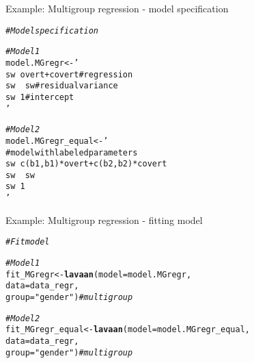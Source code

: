 \documentclass[10pt]{beamer}\usepackage[]{graphicx}\usepackage[]{xcolor}
\makeatletter
\newcommand{\hlsng}[1]{\textcolor[rgb]{0.192,0.494,0.8}{#1}}%
\newcommand{\hlcom}[1]{\textcolor[rgb]{0.678,0.584,0.686}{\textit{#1}}}%
\newcommand{\hldef}[1]{\textcolor[rgb]{0.345,0.345,0.345}{#1}}%
\newcommand{\hlkwb}[1]{\textcolor[rgb]{0.69,0.353,0.396}{#1}}%
\newcommand{\hlkwc}[1]{\textcolor[rgb]{0.333,0.667,0.333}{#1}}%
\newcommand{\hlkwd}[1]{\textcolor[rgb]{0.737,0.353,0.396}{\textbf{#1}}}%
\newenvironment{kframe}{%
 \def\at@end@of@kframe{}%
 \ifinner\ifhmode%
  \def\at@end@of@kframe{\end{minipage}}%
  \begin{minipage}{\columnwidth}%
 \fi\fi%
 \def\FrameCommand##1{\hskip\@totalleftmargin \hskip-\fboxsep
 \colorbox{shadecolor}{##1}\hskip-\fboxsep
     \hskip-\linewidth \hskip-\@totalleftmargin \hskip\columnwidth}%
 \MakeFramed {\advance\hsize-\width
   \@totalleftmargin\z@ \linewidth\hsize
   \@setminipage}}%
 {\par\unskip\endMakeFramed%
 \at@end@of@kframe}
\newenvironment{knitrout}{}{} %
\makeatother
\begin{document}
\begin{frame}[fragile]{Example: Multigroup regression - model specification}

\begin{knitrout}
\color{fgcolor}\begin{kframe}
\begin{alltt}
\hlcom{# Model specification}

\hlcom{# Model 1}
\hldef{model.MGregr} \hlkwb{<-} \hlsng{'
  sw ~ overt + covert # regression
  sw ~~ sw            # residual variance
  sw ~ 1              # intercept
'}

\hlcom{# Model 2}
\hldef{model.MGregr_equal} \hlkwb{<-} \hlsng{'
  # model with labeled parameters
  sw ~ c(b1,b1)*overt + c(b2,b2)*covert 
  sw ~~ sw                                      
  sw ~ 1                                        
'}
\end{alltt}
\end{kframe}
\end{knitrout}
          
\end{frame}
%
\begin{frame}[fragile]{Example: Multigroup regression - fitting model}

\begin{knitrout}
\color{fgcolor}\begin{kframe}
\begin{alltt}
\hlcom{# Fit model}

\hlcom{# Model 1}
\hldef{fit_MGregr} \hlkwb{<-} \hlkwd{lavaan}\hldef{(}\hlkwc{model} \hldef{= model.MGregr,}
                    \hlkwc{data} \hldef{= data_regr,}
                    \hlkwc{group} \hldef{=} \hlsng{"gender"}\hldef{)} \hlcom{# multigroup}

\hlcom{# Model 2}
\hldef{fit_MGregr_equal} \hlkwb{<-} \hlkwd{lavaan}\hldef{(}\hlkwc{model} \hldef{= model.MGregr_equal,}
                    \hlkwc{data} \hldef{= data_regr,}
                    \hlkwc{group} \hldef{=} \hlsng{"gender"}\hldef{)} \hlcom{# multigroup}
\end{alltt}
\end{kframe}
\end{knitrout}
          
\end{frame}
\end{document}
